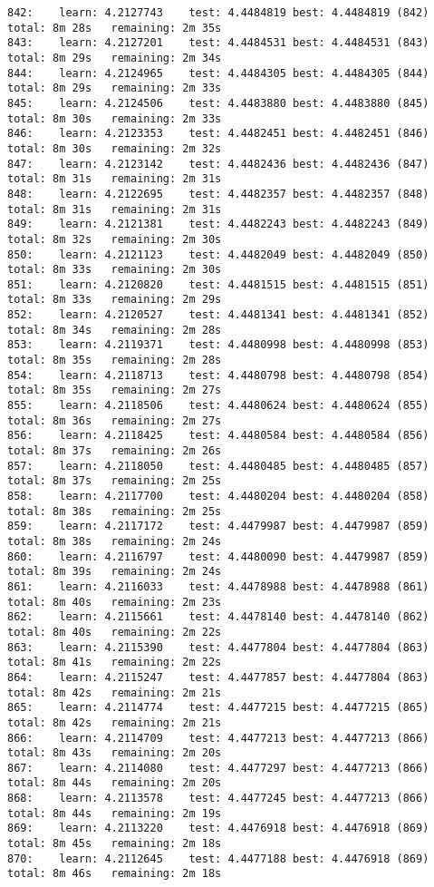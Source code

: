\documentclass[11pt]{article}
\begin{document}
\begin{Verbatim}[commandchars=\\\{\}]
842:	learn: 4.2127743	test: 4.4484819	best: 4.4484819 (842)	total: 8m 28s	remaining: 2m 35s
843:	learn: 4.2127201	test: 4.4484531	best: 4.4484531 (843)	total: 8m 29s	remaining: 2m 34s
844:	learn: 4.2124965	test: 4.4484305	best: 4.4484305 (844)	total: 8m 29s	remaining: 2m 33s
845:	learn: 4.2124506	test: 4.4483880	best: 4.4483880 (845)	total: 8m 30s	remaining: 2m 33s
846:	learn: 4.2123353	test: 4.4482451	best: 4.4482451 (846)	total: 8m 30s	remaining: 2m 32s
847:	learn: 4.2123142	test: 4.4482436	best: 4.4482436 (847)	total: 8m 31s	remaining: 2m 31s
848:	learn: 4.2122695	test: 4.4482357	best: 4.4482357 (848)	total: 8m 31s	remaining: 2m 31s
849:	learn: 4.2121381	test: 4.4482243	best: 4.4482243 (849)	total: 8m 32s	remaining: 2m 30s
850:	learn: 4.2121123	test: 4.4482049	best: 4.4482049 (850)	total: 8m 33s	remaining: 2m 30s
851:	learn: 4.2120820	test: 4.4481515	best: 4.4481515 (851)	total: 8m 33s	remaining: 2m 29s
852:	learn: 4.2120527	test: 4.4481341	best: 4.4481341 (852)	total: 8m 34s	remaining: 2m 28s
853:	learn: 4.2119371	test: 4.4480998	best: 4.4480998 (853)	total: 8m 35s	remaining: 2m 28s
854:	learn: 4.2118713	test: 4.4480798	best: 4.4480798 (854)	total: 8m 35s	remaining: 2m 27s
855:	learn: 4.2118506	test: 4.4480624	best: 4.4480624 (855)	total: 8m 36s	remaining: 2m 27s
856:	learn: 4.2118425	test: 4.4480584	best: 4.4480584 (856)	total: 8m 37s	remaining: 2m 26s
857:	learn: 4.2118050	test: 4.4480485	best: 4.4480485 (857)	total: 8m 37s	remaining: 2m 25s
858:	learn: 4.2117700	test: 4.4480204	best: 4.4480204 (858)	total: 8m 38s	remaining: 2m 25s
859:	learn: 4.2117172	test: 4.4479987	best: 4.4479987 (859)	total: 8m 38s	remaining: 2m 24s
860:	learn: 4.2116797	test: 4.4480090	best: 4.4479987 (859)	total: 8m 39s	remaining: 2m 24s
861:	learn: 4.2116033	test: 4.4478988	best: 4.4478988 (861)	total: 8m 40s	remaining: 2m 23s
862:	learn: 4.2115661	test: 4.4478140	best: 4.4478140 (862)	total: 8m 40s	remaining: 2m 22s
863:	learn: 4.2115390	test: 4.4477804	best: 4.4477804 (863)	total: 8m 41s	remaining: 2m 22s
864:	learn: 4.2115247	test: 4.4477857	best: 4.4477804 (863)	total: 8m 42s	remaining: 2m 21s
865:	learn: 4.2114774	test: 4.4477215	best: 4.4477215 (865)	total: 8m 42s	remaining: 2m 21s
866:	learn: 4.2114709	test: 4.4477213	best: 4.4477213 (866)	total: 8m 43s	remaining: 2m 20s
867:	learn: 4.2114080	test: 4.4477297	best: 4.4477213 (866)	total: 8m 44s	remaining: 2m 20s
868:	learn: 4.2113578	test: 4.4477245	best: 4.4477213 (866)	total: 8m 44s	remaining: 2m 19s
869:	learn: 4.2113220	test: 4.4476918	best: 4.4476918 (869)	total: 8m 45s	remaining: 2m 18s
870:	learn: 4.2112645	test: 4.4477188	best: 4.4476918 (869)	total: 8m 46s	remaining: 2m 18s

\end{Verbatim}
\end{document}
